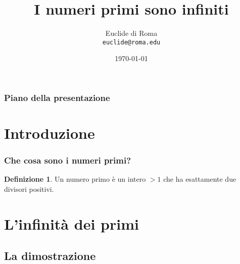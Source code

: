\documentclass{beamer} %
\title{I numeri primi sono infiniti}
\author[Euclide]{Euclide di Roma\\\texttt{euclide@roma.edu}}
\date[\today]{\today}
\institute[Roma]{DIPARTIMENTO DI INGEGNERIA INFORMATICA\\[-0.1cm] AUTOMATICA E GESTIONALE ANTONIO RUBERTI}
\theoremstyle{definition}
\newtheorem{definizione}{Definizione}
\theoremstyle{plain}
\begin{document}

\titlepageframe %


\begin{frame}
  \frametitle{Piano della presentazione} %
  \tableofcontents %
\end{frame}




\section{Introduzione}

\begin{frame}
  \frametitle{Che cosa sono i numeri primi?} %
  \begin{definizione}
    Un \alert{numero primo} è un intero $>1$ che ha esattamente due divisori positivi.
  \end{definizione}
\end{frame}


\section{L'infinità dei primi}
\subsection{La dimostrazione}
\end{document}
